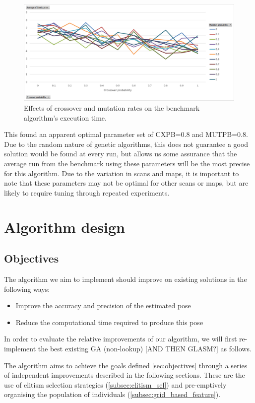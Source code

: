 \documentclass[authoryearcitations]{UoYCSproject}
\begin{document}
\begin{figure}[]
\centering
	\includegraphics[width=12cm,keepaspectratio]{images/ga_cxpb_mutpb.png}
	\caption{Effects of crossover and mutation rates on the benchmark algorithm's execution time.}
	\label{fig:ga_cxpb_mutpb}
\end{figure}

 This found an apparent optimal parameter set of CXPB=0.8 and MUTPB=0.8. Due to the random nature of genetic algorithms, this does not guarantee a good solution would be found at every run, but allows us some assurance that the average run from the benchmark using these parameters will be the most precise for this algorithm. Due to the variation in scans and maps, it is important to note that these parameters may not be optimal for other scans or maps, but are likely to require tuning through repeated experiments. 


\chapter{Algorithm design}
\section{Objectives}
\label{sec:objectives}
The algorithm we aim to implement should improve on existing solutions in the following ways:
\begin{itemize}
	\item Improve the accuracy and precision of the estimated pose
	\item Reduce the computational time required to produce this pose
\end{itemize}
In order to evaluate the relative improvements of our algorithm, we will first re-implement the best existing GA (non-lookup) [AND THEN GLASM?] as follows.

The algorithm aims to achieve the goals defined \autoref{sec:objectives} through a series of independent improvements described in the following sections. These are the use of elitism selection strategies (\autoref{subsec:elitism_sel}) and pre-emptively organising the population of individuals (\autoref{subsec:grid_based_feature}).
\end{document}
